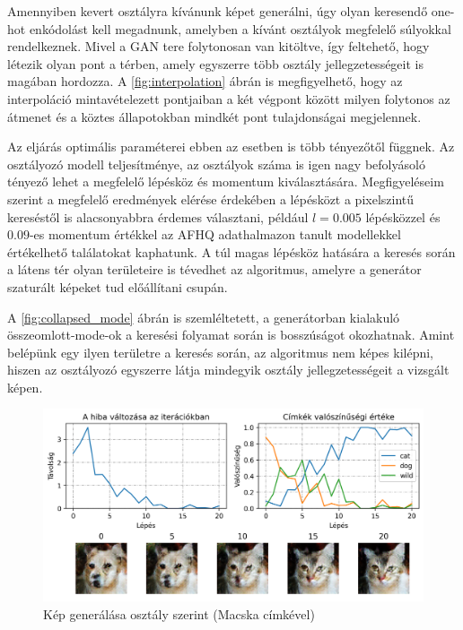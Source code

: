 Amennyiben kevert osztályra kívánunk képet generálni, úgy olyan keresendő one-hot enkódolást kell megadnunk, amelyben a kívánt osztályok megfelelő súlyokkal rendelkeznek. Mivel a GAN tere folytonosan van kitöltve, így feltehető, hogy létezik olyan pont a térben, amely egyszerre több osztály jellegzetességeit is magában hordozza. A \ref{fig:interpolation} ábrán is megfigyelhető, hogy az interpoláció mintavételezett pontjaiban a két végpont között milyen folytonos az átmenet és a köztes állapotokban mindkét pont tulajdonságai megjelennek.

Az eljárás optimális paraméterei ebben az esetben is több tényezőtől függnek. Az osztályozó modell teljesítménye, az osztályok száma is igen nagy befolyásoló tényező lehet a megfelelő lépésköz és momentum kiválasztására.  Megfigyeléseim szerint a megfelelő eredmények elérése érdekében a lépésközt a pixelszintű kereséstől is alacsonyabbra érdemes választani, például $l=0.005$ lépésközzel és $0.09$-es momentum értékkel az AFHQ adathalmazon tanult modellekkel értékelhető találatokat kaphatunk. A túl magas lépésköz hatására a keresés során a látens tér olyan területeire is tévedhet az algoritmus, amelyre a generátor szaturált képeket tud előállítani csupán.

A \ref{fig:collapsed_mode} ábrán is szemléltetett, a generátorban kialakuló összeomlott-mode-ok a keresési folyamat során is bosszúságot okozhatnak. Amint belépünk egy ilyen területre a keresés során, az algoritmus nem képes kilépni, hiszen az osztályozó egyszerre látja mindegyik osztály jellegzetességeit a vizsgált képen.


\begin{figure}[h]
	\centering
	\includegraphics[width=15cm]{images/searching-cat.png}
	\caption{Kép generálása osztály szerint (Macska címkével)}
	\label{fig:searching}
\end{figure}

